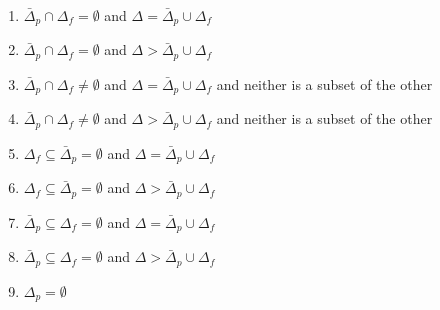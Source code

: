 \documentclass{article}
\author{Jochen Wuttke}
\title{}	%
\begin{document}
\begin{enumerate}
\item $\bar\Delta_p \cap \Delta_f = \emptyset $ and $\Delta = \bar\Delta_p \cup \Delta_f$

\item $\bar\Delta_p \cap \Delta_f = \emptyset $ and $\Delta > \bar\Delta_p \cup \Delta_f$

\item $\bar\Delta_p \cap \Delta_f \neq \emptyset $ and $\Delta = \bar\Delta_p
\cup \Delta_f$ and neither is a subset of the other

\item $\bar\Delta_p \cap \Delta_f \neq \emptyset $ and $\Delta > \bar\Delta_p
\cup \Delta_f$ and neither is a subset of the other

\item $\Delta_f \subseteq \bar\Delta_p = \emptyset $ and $\Delta = \bar\Delta_p \cup \Delta_f$

\item $\Delta_f \subseteq \bar\Delta_p = \emptyset $ and $\Delta > \bar\Delta_p \cup \Delta_f$

\item $\bar\Delta_p \subseteq \Delta_f = \emptyset $ and $\Delta = \bar\Delta_p \cup \Delta_f$

\item $\bar\Delta_p \subseteq \Delta_f = \emptyset $ and $\Delta > \bar\Delta_p \cup \Delta_f$

\item $\Delta_p = \emptyset$

\end{enumerate}
\end{document}
